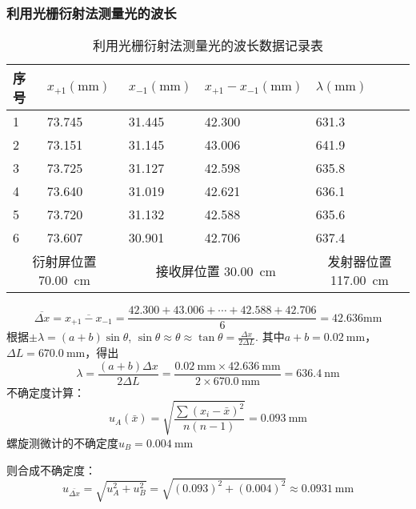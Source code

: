 \documentclass[]{../template/Report}%
\begin{document}
\begin{fullreportonly}
\subsubsection{利用光栅衍射法测量光的波长}
\begin{table}[H]
\centering
\caption{利用光栅衍射法测量光的波长数据记录表}
\label{tab:lambda}
\begin{tabular}{|ll|ll|l|}
\hline
\multicolumn{1}{|l|}{序号} & $x_{+1}(\si{\mm})$ & \multicolumn{1}{l|}{$x_{-1}(\si{\mm})$} & $x_{+1} - x_{-1}(\si{\mm})$ & $\lambda(\si{\mm})$                        \\ \hline
\multicolumn{1}{|l|}{1} & 73.745 & \multicolumn{1}{l|}{31.445} & 42.300 & 631.3 \\ \hline
\multicolumn{1}{|l|}{2} & 73.151 & \multicolumn{1}{l|}{31.145} & 43.006 & 641.9 \\ \hline
\multicolumn{1}{|l|}{3} & 73.725 & \multicolumn{1}{l|}{31.127} & 42.598 & 635.8 \\ \hline
\multicolumn{1}{|l|}{4} & 73.640 & \multicolumn{1}{l|}{31.019} & 42.621 & 636.1 \\ \hline
\multicolumn{1}{|l|}{5} & 73.720 & \multicolumn{1}{l|}{31.132} & 42.588 & 635.6 \\ \hline
\multicolumn{1}{|l|}{6} & 73.607 & \multicolumn{1}{l|}{30.901} & 42.706 & 637.4 \\ \hline
\multicolumn{2}{|c|}{衍射屏位置 \SI{70.00}{\cm}}   & \multicolumn{2}{c|}{接收屏位置 \SI{30.00}{\cm}}                            & \multicolumn{1}{c|}{发射器位置\SI{117.00}{\cm}} \\ \hline
\end{tabular}%
\end{table}
\[
\overline{\Delta x} = \overline{x_{+1} - x_{-1}} = \frac{42.300 + 43.006 + \cdots + 42.588 + 42.706}{6} = 42.636 \si{\mm}
\]
根据$\pm \lambda = (a + b)\sin \theta$, $\sin \theta \approx \theta \approx \tan \theta = \frac{\Delta x}{2\Delta L}$. 其中$a + b = \SI{0.02}{\mm}$，$\Delta L = \SI{670.0}{\mm}$，得出
\[
\lambda = \frac{(a + b)\Delta x}{2\Delta L} = \frac{\SI{0.02}{\mm} \times \SI{42.636}{\mm}}{2 \times \SI{670.0}{\mm}} = \SI{636.4}{\nm}
\]
不确定度计算：
\[
u_A(\bar{x}) = \sqrt{\frac{\sum{(x_i - \bar{x})^2}}{n(n-1)}} = \SI{0.093}{\mm}
\]
螺旋测微计的不确定度$u_B = \SI{0.004}{\mm}$

则合成不确定度：
\[u_{\bar{\Delta x}} = \sqrt{u_A^2 + u_B^2} = \sqrt{(0.093)^2 + (0.004)^2} \approx \SI{0.0931}{\mm}\]


\end{fullreportonly}
\end{document}
